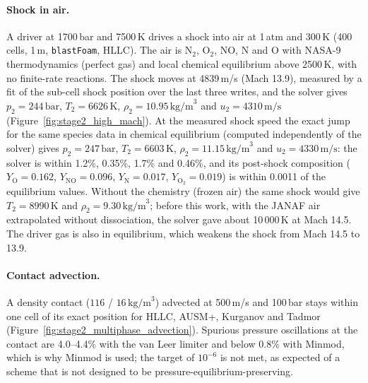 \documentclass{article}
\begin{document}
\paragraph{Shock in air.} A driver at 1700\,bar and 7500\,K drives a shock into air at 1\,atm and 300\,K (400 cells, 1\,m, \texttt{blastFoam}, HLLC). The air is N$_2$, O$_2$, NO, N and O with NASA-9 thermodynamics (perfect gas) and local chemical equilibrium above 2500\,K, with no finite-rate reactions. The shock moves at 4839\,m/s (Mach 13.9), measured by a fit of the sub-cell shock position over the last three writes, and the solver gives $p_2 = 244\,\text{bar}$, $T_2 = 6626\,\text{K}$, $\rho_2 = 10.95\,\text{kg/m}^3$ and $u_2 = 4310\,\text{m/s}$ (Figure~\ref{fig:stage2_high_mach}). At the measured shock speed the exact jump for the same species data in chemical equilibrium (computed independently of the solver) gives $p_2 = 247\,\text{bar}$, $T_2 = 6603\,\text{K}$, $\rho_2 = 11.15\,\text{kg/m}^3$ and $u_2 = 4330\,\text{m/s}$: the solver is within 1.2\%, 0.35\%, 1.7\% and 0.46\%, and its post-shock composition ($Y_\text{O} = 0.162$, $Y_\text{NO} = 0.096$, $Y_\text{N} = 0.017$, $Y_{\text{O}_2} = 0.019$) is within 0.0011 of the equilibrium values. Without the chemistry (frozen air) the same shock would give $T_2 = 8990\,\text{K}$ and $\rho_2 = 9.30\,\text{kg/m}^3$; before this work, with the JANAF air extrapolated without dissociation, the solver gave about 10\,000\,K at Mach 14.5. The driver gas is also in equilibrium, which weakens the shock from Mach 14.5 to 13.9.

\paragraph{Contact advection.} A density contact ($116$ / $16\,\text{kg/m}^3$) advected at 500\,m/s and 100\,bar stays within one cell of its exact position for HLLC, AUSM+, Kurganov and Tadmor (Figure~\ref{fig:stage2_multiphase_advection}). Spurious pressure oscillations at the contact are 4.0--4.4\% with the van Leer limiter and below 0.8\% with Minmod, which is why Minmod is used; the target of $10^{-6}$ is not met, as expected of a scheme that is not designed to be pressure-equilibrium-preserving.
\end{document}
